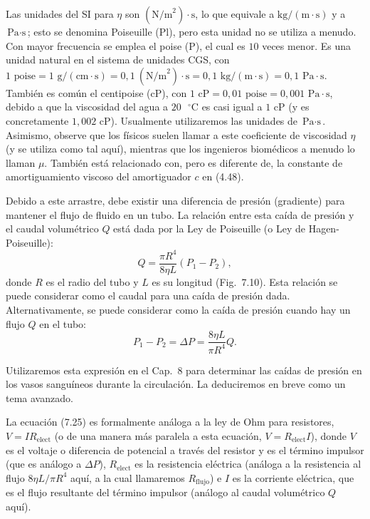\documentclass[12pt]{book}
\begin{document}
Las unidades del SI para $\eta$ son $(\text{N/m}^2)\cdot\text{s}$, lo que equivale a $\text{kg}/(\text{m}\cdot\text{s})$ y a $\text{Pa}\cdot\text{s}$; esto se denomina Poiseuille (Pl), pero esta unidad no se utiliza a menudo. Con mayor frecuencia se emplea el poise (P), el cual es $10$ veces menor. Es una unidad natural en el sistema de unidades CGS, con $1\text{ poise} = 1\text{ g}/(\text{cm}\cdot\text{s}) = 0{,}1\ (\text{N/m}^2)\cdot\text{s} = 0{,}1\text{ kg}/(\text{m}\cdot\text{s}) = 0{,}1\text{ Pa}\cdot\text{s}$. También es común el centipoise (cP), con $1\text{ cP} = 0{,}01\text{ poise} = 0{,}001\text{ Pa}\cdot\text{s}$, debido a que la viscosidad del agua a $20\text{ }^\circ\text{C}$ es casi igual a $1\text{ cP}$ (y es concretamente $1{,}002\text{ cP}$). Usualmente utilizaremos las unidades de $\text{Pa}\cdot\text{s}$. Asimismo, observe que los físicos suelen llamar a este coeficiente de viscosidad $\eta$ (y se utiliza como tal aquí), mientras que los ingenieros biomédicos a menudo lo llaman $\mu$. También está relacionado con, pero es diferente de, la constante de amortiguamiento viscoso del amortiguador $c$ en (4.48).

Debido a este arrastre, debe existir una diferencia de presión (gradiente) para mantener el flujo de fluido en un tubo. La relación entre esta caída de presión y el caudal volumétrico $Q$ está dada por la Ley de Poiseuille (o Ley de Hagen-Poiseuille):
\begin{equation}
Q = \frac{\pi R^4}{8\eta L} (P_1 - P_2),
\label{eq:724}
\end{equation}
donde $R$ es el radio del tubo y $L$ es su longitud (Fig.~7.10). Esta relación se puede considerar como el caudal para una caída de presión dada. Alternativamente, se puede considerar como la caída de presión cuando hay un flujo $Q$ en el tubo:
\begin{equation}
P_1 - P_2 = \Delta P = \frac{8\eta L}{\pi R^4} Q.
\label{eq:725}
\end{equation}

Utilizaremos esta expresión en el Cap.~8 para determinar las caídas de presión en los vasos sanguíneos durante la circulación. La deduciremos en breve como un tema avanzado.

La ecuación (7.25) es formalmente análoga a la ley de Ohm para resistores, $V = I R_{\text{elect}}$ (o de una manera más paralela a esta ecuación, $V = R_{\text{elect}} I$), donde $V$ es el voltaje o diferencia de potencial a través del resistor y es el término impulsor (que es análogo a $\Delta P$), $R_{\text{elect}}$ es la resistencia eléctrica (análoga a la resistencia al flujo $8\eta L/\pi R^4$ aquí, a la cual llamaremos $R_{\text{flujo}}$) e $I$ es la corriente eléctrica, que es el flujo resultante del término impulsor (análogo al caudal volumétrico $Q$ aquí).
\end{document}
